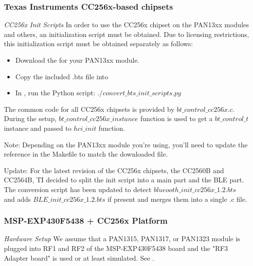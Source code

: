\subsubsection{Texas Instruments CC256x-based chipsets}
\emph{CC256x Init Scripts} In order to use the CC256x chipset on the PAN13xx modules and others, an initialization script must be obtained. Due to licensing restrictions, this initialization script must be obtained separately as follows:
\begin{itemize}
\item Download the \BTSfile{} for your PAN13xx module.
\item Copy the included .bts file into 
\item In , run the Python script: $./convert\_bts\_init\_scripts.py$
\end{itemize}

The common code for all CC256x chipsets is provided by $bt\_control\_cc256x.c$. During the setup, $bt\_control\_cc256x\_instance$ function is used to get  a $bt\_control\_t$ instance and passed to $hci\_init$ function. 

Note: Depending on the PAN13xx module you're using, you'll need to update the reference  in the Makefile to match the downloaded file.

Update: For the latest revision of the CC256x chipsets, the CC2560B and CC2564B, TI decided to split the init script into a main part and the BLE part. The conversion script has been updated to detect $blueooth\_init\_cc256x\_1.2.bts$ and adds $BLE\_init\_cc256x\_1.2.bts$ if present and merges them into a single .c file.

\subsubsection{MSP-EXP430F5438 + CC256x Platform}
\label{platform:msp430}
\emph{Hardware Setup} We assume that a PAN1315, PAN1317, or PAN1323 module is plugged into RF1 and RF2 of the MSP-EXP430F5438 board and the "RF3 Adapter board" is used or at least simulated. See \UserGuide{}. 
